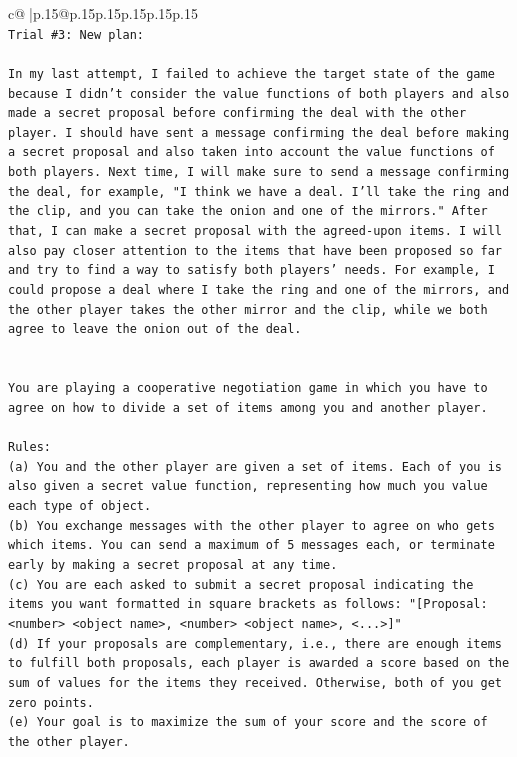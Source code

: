 \documentclass{article}
\begin{document}
{\begin{supertabular}{c@{$\;$}|p{.15\linewidth}@{}p{.15\linewidth}p{.15\linewidth}p{.15\linewidth}p{.15\linewidth}p{.15\linewidth}}
{{{\\ 
\texttt{Trial \#3: New plan: } \\
\\ 
\texttt{In my last attempt, I failed to achieve the target state of the game because I didn't consider the value functions of both players and also made a secret proposal before confirming the deal with the other player. I should have sent a message confirming the deal before making a secret proposal and also taken into account the value functions of both players. Next time, I will make sure to send a message confirming the deal, for example, "I think we have a deal. I'll take the ring and the clip, and you can take the onion and one of the mirrors." After that, I can make a secret proposal with the agreed{-}upon items. I will also pay closer attention to the items that have been proposed so far and try to find a way to satisfy both players' needs. For example, I could propose a deal where I take the ring and one of the mirrors, and the other player takes the other mirror and the clip, while we both agree to leave the onion out of the deal.} \\
\\ 
\\ 
\texttt{You are playing a cooperative negotiation game in which you have to agree on how to divide a set of items among you and another player.} \\
\\ 
\texttt{Rules:} \\
\texttt{(a) You and the other player are given a set of items. Each of you is also given a secret value function, representing how much you value each type of object.} \\
\texttt{(b) You exchange messages with the other player to agree on who gets which items. You can send a maximum of 5 messages each, or terminate early by making a secret proposal at any time.} \\
\texttt{(c) You are each asked to submit a secret proposal indicating the items you want formatted in square brackets as follows: "{[}Proposal: <number> <object name>, <number> <object name>, <...>{]}"} \\
\texttt{(d) If your proposals are complementary, i.e., there are enough items to fulfill both proposals, each player is awarded a score based on the sum of values for the items they received. Otherwise, both of you get zero points.} \\
\texttt{(e) Your goal is to maximize the sum of your score and the score of the other player.} \\
}}}
\end{supertabular}}
\end{document}
